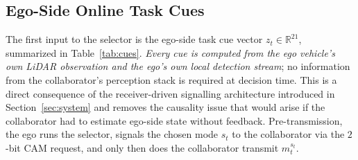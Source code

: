 \documentclass[journal]{IEEEtran}
\begin{document}
\subsection{Ego-Side Online Task Cues}\label{sec:cues}

The first input to the selector is the ego-side task cue vector $z_t \in \mathbb{R}^{21}$, summarized in Table~\ref{tab:cues}. \emph{Every cue is computed from the ego vehicle's own LiDAR observation and the ego's own local detection stream}; no information from the collaborator's perception stack is required at decision time. This is a direct consequence of the receiver-driven signalling architecture introduced in Section~\ref{sec:system} and removes the causality issue that would arise if the collaborator had to estimate ego-side state without feedback. Pre-transmission, the ego runs the selector, signals the chosen mode $s_t$ to the collaborator via the $2$-bit CAM request, and only then does the collaborator transmit $m_t^{s_t}$.
\end{document}
